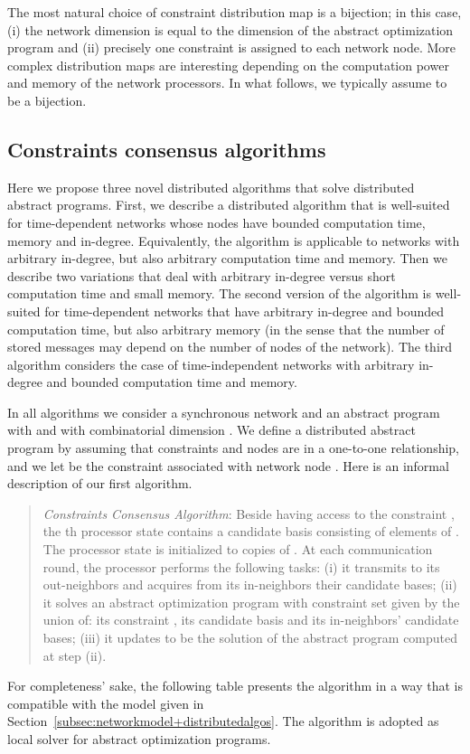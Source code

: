 \documentclass[onecolumn,journal,letterpaper]{IEEEtran}
\newcommand\oprocendsymbol{\hbox{}}
\newcommand\oprocend{\relax\ifmmode\else\unskip\hfill\fi\oprocendsymbol}
\begin{document}
\begin{remark}
  The most natural choice of constraint distribution map  is a
  bijection; in this case, (i) the network dimension is equal to the
  dimension of the abstract optimization program and (ii) precisely one
  constraint is assigned to each network node.  More complex distribution
  maps are interesting depending on the computation power and memory of the
  network processors.  In what follows, we typically assume  to
  be a bijection. \oprocend
\end{remark}



\subsection{Constraints consensus algorithms}
Here we propose three novel distributed algorithms that solve distributed
abstract programs.  First, we describe a distributed algorithm that
is well-suited for time-dependent networks whose nodes have bounded
computation time, memory and in-degree.  Equivalently, the algorithm is
applicable to networks with arbitrary in-degree, but also arbitrary
computation time and memory.
Then we describe two variations that deal with arbitrary in-degree versus
short computation time and small memory. The second version of the
algorithm is well-suited for time-dependent networks that have arbitrary
in-degree and bounded computation time, but also arbitrary memory (in the
sense that the number of stored messages may depend on the number of nodes
of the network).  The third algorithm considers the case of
time-independent networks with arbitrary in-degree and bounded computation
time and memory.

In all algorithms we consider a synchronous network  and an abstract
program  with  and with combinatorial
dimension .  We define a distributed abstract program by assuming
that constraints and nodes are in a one-to-one relationship, and we let
 be the constraint associated with network node . Here is an
informal description of our first algorithm.
\begin{quote}
  \emph{Constraints Consensus Algorithm}: Beside having access to the
  constraint , the th processor state contains a candidate basis
   consisting of  elements of .  The processor
  state  is initialized to  copies of . At each
  communication round, the processor performs the following tasks: (i) it
  transmits  to its out-neighbors and acquires from its
  in-neighbors their candidate bases; (ii) it solves an abstract optimization
  program with constraint set given by the union of: its constraint ,
  its candidate basis  and its in-neighbors' candidate
  bases; (iii) it updates  to be the solution of the
  abstract program computed at step (ii).
\end{quote}
For completeness' sake, the following table presents the algorithm in a way
that is compatible with the model given in
Section~\ref{subsec:networkmodel+distributedalgos}.  The 
algorithm is adopted as local solver for abstract optimization programs.
\end{document}
